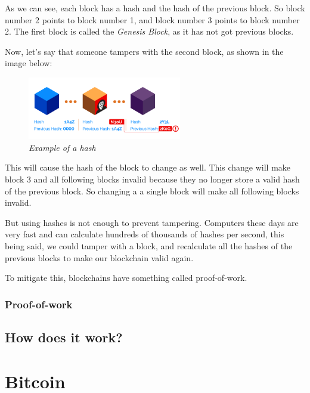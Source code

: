 \documentclass{article}
\begin{document}
As we can see, each block has a hash and the hash of the previous block. So block number 2 points to block number 1, and block number 3 points to block number 2. The first block is called the \textit{Genesis Block}, as it has not got previous blocks.

Now, let's say that someone tampers with the second block, as shown in the image below:

\begin{figure}[H]
    \begin{center}
        \includegraphics[width=0.6\textwidth]{images/invalid_hash.png}
        \caption{\textit{Example of a hash}}
    \end{center}
\end{figure}

This will cause the hash of the block to change as well. This change will make block 3 and all following blocks invalid because they no longer store a valid hash of the previous block. So changing a a single block will make all following blocks invalid.

But using hashes is not enough to prevent tampering. Computers these days are very fast and can calculate hundreds of thousands of hashes per second, this being said, we could tamper with a block, and recalculate all the hashes of the previous blocks to make our blockchain valid again.

To mitigate this, blockchains have something called proof-of-work.

\subsubsection{Proof-of-work}



\subsection{How does it work?}

\section{Bitcoin}
\end{document}
